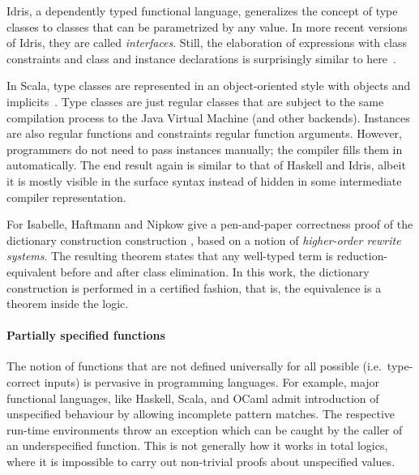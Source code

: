 Idris, a dependently typed functional language, generalizes the concept of type classes to classes that can be parametrized by any value.
In more recent versions of Idris, they are called \emph{interfaces}.
Still, the elaboration of expressions with class constraints and class and instance declarations is surprisingly similar to here~\cite{brady2013idris}.

In Scala, type classes are represented in an object-oriented style with objects and implicits~\cite{oliveira2010typeclasses}.
Type classes are just regular classes that are subject to the same compilation process to the Java Virtual Machine (and other backends).
Instances are also regular functions and constraints regular function arguments.
However, programmers do not need to pass instances manually; the compiler fills them in automatically.
The end result again is similar to that of Haskell and Idris, albeit it is mostly visible in the surface syntax instead of hidden in some intermediate compiler representation.

For Isabelle, Haftmann and Nipkow give a pen-and-paper correctness proof of the dictionary construction construction \cite[§4.1]{haftmann2010codegeneration}, based on a notion of \emph{higher-order rewrite systems}.
The resulting theorem states that any well-typed term is reduction-equivalent before and after class elimination.
In this work, the dictionary construction is performed in a certified fashion, that is, the equivalence is a theorem inside the logic.

\paragraph{Partially specified functions}
The notion of functions that are not defined universally for all possible (i.e.\ type-correct inputs) is pervasive in programming languages.
For example, major functional languages, like Haskell, Scala, and OCaml admit introduction of unspecified behaviour by allowing incomplete pattern matches.
The respective run-time environments throw an exception which can be caught by the caller of an underspecified function.
This is not generally how it works in total logics, where it is impossible to carry out non-trivial proofs about unspecified values.

